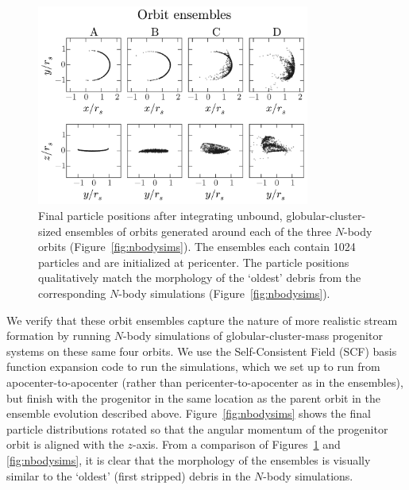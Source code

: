 \begin{figure}[h]%
\begin{center}
\includegraphics[width=0.8\textwidth]{figures/ch3/ensembles.pdf}
\caption{Final particle positions after integrating unbound,
globular-cluster-sized ensembles of orbits generated around each of the three
$N$-body orbits (Figure~\ref{fig:nbodysims}). The ensembles each contain 1024
particles and are initialized at pericenter. The particle positions
qualitatively match the morphology of the `oldest' debris from the corresponding
$N$-body simulations (Figure~\ref{fig:nbodysims}). }
\label{fig:ensembles}
\end{center}
\end{figure}

We verify that these orbit ensembles capture the nature of more realistic stream
formation by running $N$-body simulations of globular-cluster-mass progenitor
systems on these same four orbits. We use the Self-Consistent Field (SCF) basis
function expansion code \citep{hernquist92} to run the simulations, which we set
up to run from apocenter-to-apocenter (rather than pericenter-to-apocenter as in
the ensembles), but finish with the progenitor in the same location as the
parent orbit in the ensemble evolution described above.
Figure~\ref{fig:nbodysims} shows the final particle distributions rotated so
that the angular momentum of the progenitor orbit is aligned with the $z$-axis.
From a comparison of Figures~\ref{fig:ensembles} and \ref{fig:nbodysims}, it is
clear that the morphology of the ensembles is visually similar to the `oldest'
(first stripped) debris in the $N$-body simulations.

